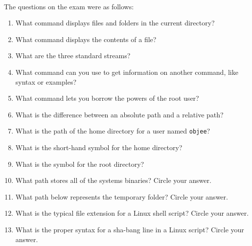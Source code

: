 \documentclass[11pt]{article}
\begin{document}
	\paragraph{} The questions on the exam were as follows:

	\begin{enumerate}
	\item  What command displays files and folders in the current directory? 
		\item  What command displays the contents of a file? 
		
		\item  What are the three standard streams? 
		
		\item  What command can you use to get information on another command, like syntax or examples?
		
		\item  What command lets you borrow the powers of the root user?
		\item  What is the difference between an absolute path and a relative path?

		\item  What is the path of the home directory for a user named \texttt{objee}?
		\item  What is the short-hand symbol for the home directory?

		\item  What is the symbol for the root directory?
				\item  What path stores all of the systems binaries? Circle your answer. \\

		\item  What path below represents the temporary folder? Circle your answer. \\

		\item  What is the typical file extension for a Linux shell script? Circle your answer. \\


		\item  What is the proper syntax for a sha-bang line in a Linux script? Circle your answer. \\


\end{enumerate}
\end{document}

